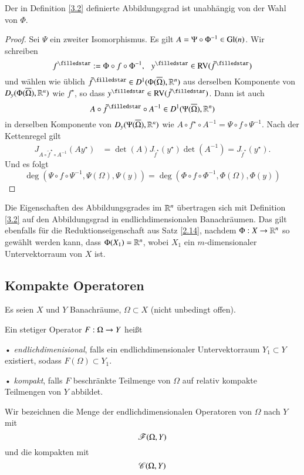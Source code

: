 \begin{prop}\label{3.3}
    Der in Definition \ref{3.2} definierte Abbildungsgrad ist unabhängig von der Wahl von $\Phi$.
\end{prop}

\begin{proof}
    Sei $\Psi$ ein zweiter Isomorphismus. Es gilt $A=\Psi\circ\Phi^{-1}\in \mathrm{Gl}(n)$. Wir schreiben
    \[
        f^\star:=\Phi \circ f \circ \Phi^{-1}, \qq y^\star\in \RV(\tilde f^\star)
    \]
    und wählen wie üblich $\tilde f^\star\in D^1(\Phi(\ol\Omega),\R^n)$ aus derselben Komponente von
    $D_y(\Phi(\overline \Omega),\mathbb{R}^n)$ wie $f^\star$, so dass $y^\star\in \RV(\tilde f^\star)$. Dann ist auch
    \[
        A\circ \tilde f^\star \circ A^{-1}\in D^1(\Psi (\ol \Omega),\R^n)
    \]
    in derselben Komponente von $D_y(\Psi(\overline \Omega),\mathbb{R}^n)$ wie $A\circ f^\star\circ A^{-1}=\Psi\circ
    f\circ \Psi^{-1}$.
    Nach der Kettenregel gilt
    \begin{align*}
        J_{A\circ \tilde f^\star\circ A^{-1}}(Ay^\star)&= \det(A) J_{\tilde f^\star}(y^\star)
        \det(A^{-1})=J_{\tilde f^\star} (y^\star).
    \end{align*}
    Und es folgt
    \[ 
        \deg(\Psi\circ f \circ\Psi^{-1},\Psi(\Omega),\Psi(y))
        = \deg(\Phi\circ f \circ\Phi^{-1},\Phi(\Omega),\Phi(y))
    \]
\end{proof}

Die Eigenschaften des Abbildungsgrades im $\mathbb{R}^n$ übertragen sich mit Definition \ref{3.2} auf den
Abbildungsgrad in endlichdimensionalen Banachräumen. Das gilt ebenfalls für die Reduktionseigenschaft aus
Satz \ref{2.14}, nachdem $\Phi:X\rightarrow\mathbb{R}^n$ so gewählt werden kann, dass $\Phi(X_1)=\mathbb{R}^n$, wobei $X_1$ ein
$m$-dimensionaler Untervektorraum von $X$ ist.

\subsection{Kompakte Operatoren}

Es seien $X$ und $Y$ Banachräume, $\Omega\subset X$ (nicht unbedingt offen).

\begin{defi}
    Ein stetiger Operator $F:\Omega\rightarrow Y$ heißt
    \begin{description}
        \item{•} \textit{endlichdimenisional}, falls ein endlichdimensionaler Untervektorraum $Y_1\subset Y$
        existiert, sodass $F(\Omega)\subset Y_1$.
        \item{•} \textit{kompakt}, falls $F$ beschränkte Teilmenge von $\Omega$ auf relativ kompakte
        Teilmengen von $Y$ abbildet.
    \end{description}
    Wir bezeichnen die Menge der endlichdimensionalen Operatoren von $\Omega$ nach $Y$ mit
    \[
        \mathscr F(\Omega,Y)
    \]
    und die kompakten mit
    \[
        \mathscr C(\Omega,Y)
    \]
\end{defi}

